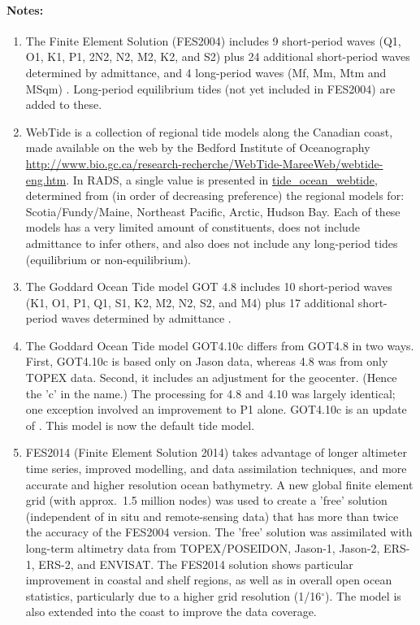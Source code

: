 \documentclass[a4paper,11pt,openany,natbib,nomargin]{thesis}
\makeatletter
\renewcommand\deg{\ensuremath{^\circ}}
\newcommand\var[1]{\url{#1}\index{variables!#1@\protect\url{#1}}}
\newenvironment{notes}[1][Notes:]{\FloatBarrier\paragraph{#1}\begin{enumerate}}{\end{enumerate}}
\makeatother
\begin{document}
\begin{notes}
\item The Finite Element Solution (FES2004) includes 9 short-period waves (Q1, O1, K1, P1, 2N2, N2, M2, K2, and S2) plus 24 additional short-period waves determined by admittance, and 4 long-period waves (Mf, Mm, Mtm and MSqm) \citep{lyard2006}. Long-period equilibrium tides (not yet included in FES2004) are added to these.\label{item:tide_ocean_fes04}\label{item:tide_load_fes04}
\item WebTide is a collection of regional tide models along the Canadian coast, made available on the web by the Bedford Institute of Oceanography \url{http://www.bio.gc.ca/research-recherche/WebTide-MareeWeb/webtide-eng.htm}. In RADS, a single value is presented in \var{tide_ocean_webtide}, determined from (in order of decreasing preference) the regional models for: Scotia/Fundy/Maine, Northeast Pacific, Arctic, Hudson Bay. Each of these models has a very limited amount of constituents, does not include admittance to infer others, and also does not include any long-period tides (equilibrium or non-equilibrium).\label{item:tide_ocean_webtide}
\item The Goddard Ocean Tide model GOT 4.8 includes 10 short-period waves (K1, O1, P1, Q1, S1, K2, M2, N2, S2, and M4) plus 17 additional short-period waves determined by admittance \citep{ray2011}.\label{item:tide_ocean_got48}\label{item:tide_load_got48}
\item The Goddard Ocean Tide model GOT4.10c differs from GOT4.8 in two ways. First, GOT4.10c is based only on Jason data, whereas 4.8 was from only TOPEX data. Second, it includes an adjustment for the geocenter. (Hence the 'c' in the name.) The processing for 4.8 and 4.10 was largely identical; one exception involved an improvement to P1 alone. GOT4.10c is an update of \citet{ray2013}. This model is now the default tide model.\label{item:tide_ocean_got410}\label{item:tide_load_got410}
\item FES2014 (Finite Element Solution 2014) takes advantage of longer altimeter time series, improved modelling, and data assimilation techniques, and more accurate and higher resolution ocean bathymetry. A new global finite element grid (with approx.\ 1.5 million nodes) was used to create a 'free' solution (independent of in situ and remote-sensing data) that has more than twice the accuracy of the FES2004 version. The 'free' solution was assimilated with long-term altimetry data from TOPEX/POSEIDON, Jason-1, Jason-2, ERS-1, ERS-2, and ENVISAT. The FES2014 solution shows particular improvement in coastal and shelf regions, as well as in overall open ocean statistics, particularly due to a higher grid resolution (1/16\deg{}). The model is also extended into the coast to improve the data coverage.

\end{notes}
\end{document}
